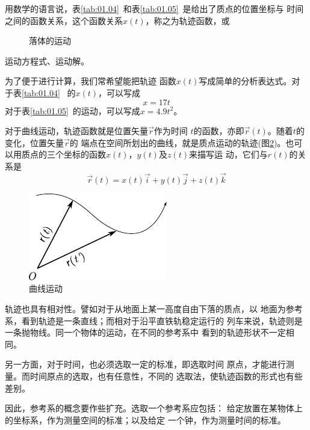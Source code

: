 用数学的语言说，表\ref{tab:01.04}~和表\ref{tab:01.05}~是给出了质点的位置坐标与
时间之间的函数关系，这个函数关系$x(t)$，称之为轨迹函数，或
\begin{figure}
    \centering
    \caption{落体的运动}
    \label{fig:01.08}
\end{figure}
运动方程式、运动解。

为了便于进行计算，我们常希望能把轨迹
函数$x(t)$写成简单的分析表达式。对于表\ref{tab:01.04}~
的$x(t)$，可以写成
\begin{equation}\label{eqn:01.05.01}
    x=17t
\end{equation}
对于表\ref{tab:01.05}~的运动，可以写成$x=4.9t^2$。

对于曲线运动，轨迹函数就是位置矢量$\vec{r}$作为时间
$t$的函数，亦即$\vec{r}(t)$。随着$t$的变化，位置矢量$\vec{r}$的
端点在空间所划出的曲线，就是质点运动的轨迹(图\ref{fig:01.09})。也可
以用质点的三个坐标的函数$x(t)$，$y(t)$及$z(t)$来描写运
动，它们与$r(t)$的关系是
\newpage
\begin{equation}\label{eqn:01.05.02}
    \vec{r}(t)=x(t)\vec{i}+y(t)\vec{j}+z(t)\vec{k}
\end{equation}

\begin{figure}
    \centering
    \includegraphics{figure/fig01.09}
    \caption{曲线运动}
    \label{fig:01.09}
\end{figure}
轨迹也具有相对性。譬如对于从地面上某一高度自由下落的质点，以
地面为参考系，看到轨迹是一条直线；而相对于沿平直铁轨稳定运行的
列车来说，轨迹则是一条抛物线。同一个物体的运动，在不同的参考系中
看到的轨迹形状不一定相同。

另一方面，对于时间，也必须选取一定的标准，即选取时间
原点，才能进行测量。而时间原点的选取，也有任意性，不同的
选取法，使轨迹函数的形式也有些差别。

因此，参考系的概念要作些扩充。选取一个参考系应包括：
给定放置在某物体上的坐标系，作为测量空间的标准；以及给定
一个钟，作为测量时间的标准。